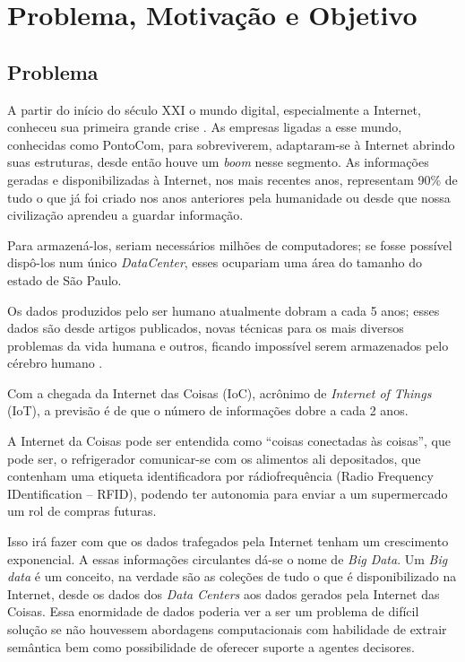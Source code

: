 \chapter{Problema, Motivação e Objetivo}\label{intro}

\section{Problema}\label{intro:problem}

A partir do início do século XXI o mundo digital, especialmente a Internet, conheceu sua primeira grande crise \cite{Quadros2005}.
As empresas ligadas a esse mundo, conhecidas como PontoCom, para sobreviverem, adaptaram-se à Internet abrindo suas estruturas, desde então houve um \textit{boom} nesse 
segmento.
As informações geradas e disponibilizadas à Internet, nos mais recentes anos, representam 90\% de tudo o que já foi criado nos anos anteriores pela humanidade ou desde que 
nossa civilização aprendeu a guardar informação.

Para armazená-los, seriam necessários milhões de computadores; se fosse possível dispô-los num único \textit{DataCenter}, esses ocupariam 
uma área do tamanho do estado de São Paulo.

Os dados produzidos pelo ser humano atualmente dobram a cada 5 anos; esses dados são desde artigos publicados, novas técnicas para os mais diversos problemas da vida humana 
e outros, ficando impossível serem armazenados pelo cérebro humano \cite{bigdataMedicina}.

Com a chegada da Internet das Coisas (IoC), acrônimo de \textit{Internet of Things} (IoT), a previsão é de que o número de informações dobre a cada 2 anos.

A Internet da Coisas pode ser entendida como ``coisas conectadas às coisas'', que pode ser, o refrigerador comunicar-se com os alimentos ali depositados, que contenham uma 
etiqueta identificadora por rádiofrequência (Radio Frequency IDentification -- RFID), podendo ter autonomia para enviar a um supermercado um rol de compras futuras. 

Isso irá fazer com que os dados trafegados pela Internet tenham um crescimento exponencial. A essas informações circulantes dá-se o nome de \textit{Big Data}. 
Um \textit{Big data} é um conceito, na verdade são as coleções de tudo o que é disponibilizado na Internet, desde os dados dos \textit{Data Centers} aos dados gerados pela Internet das Coisas.
Essa enormidade de dados poderia ver a ser um problema de difícil solução se não houvessem abordagens computacionais com habilidade de 
extrair semântica bem como possibilidade de oferecer suporte a agentes decisores.

